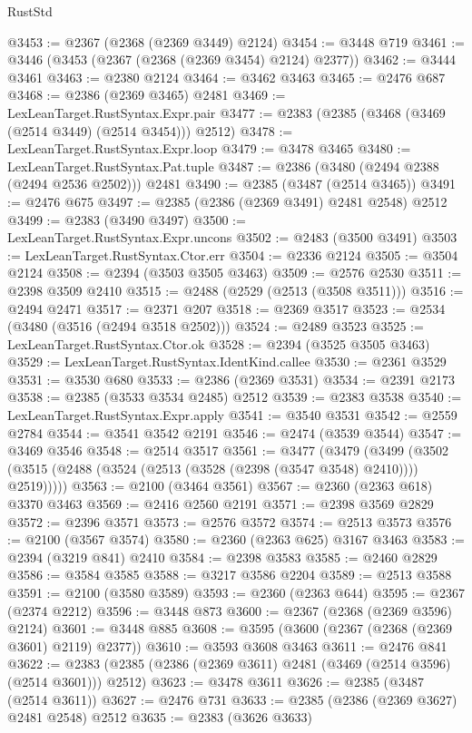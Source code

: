 \begin{lexlean}{RustStd}
\begin{coremodule}
@3453 := @2367 (@2368 (@2369 @3449) @2124)
@3454 := @3448 @719
@3461 := @3446 (@3453 (@2367 (@2368 (@2369 @3454) @2124) @2377))
@3462 := @3444 @3461
@3463 := @2380 @2124
@3464 := @3462 @3463
@3465 := @2476 @687
@3468 := @2386 (@2369 @3465) @2481
@3469 := LexLeanTarget.RustSyntax.Expr.pair
@3477 := @2383 (@2385 (@3468 (@3469 (@2514 @3449) (@2514 @3454))) @2512)
@3478 := LexLeanTarget.RustSyntax.Expr.loop
@3479 := @3478 @3465
@3480 := LexLeanTarget.RustSyntax.Pat.tuple
@3487 := @2386 (@3480 (@2494 @2388 (@2494 @2536 @2502))) @2481
@3490 := @2385 (@3487 (@2514 @3465))
@3491 := @2476 @675
@3497 := @2385 (@2386 (@2369 @3491) @2481 @2548) @2512
@3499 := @2383 (@3490 @3497)
@3500 := LexLeanTarget.RustSyntax.Expr.uncons
@3502 := @2483 (@3500 @3491)
@3503 := LexLeanTarget.RustSyntax.Ctor.err
@3504 := @2336 @2124
@3505 := @3504 @2124
@3508 := @2394 (@3503 @3505 @3463)
@3509 := @2576 @2530
@3511 := @2398 @3509 @2410
@3515 := @2488 (@2529 (@2513 (@3508 @3511)))
@3516 := @2494 @2471
@3517 := @2371 @207
@3518 := @2369 @3517
@3523 := @2534 (@3480 (@3516 (@2494 @3518 @2502)))
@3524 := @2489 @3523
@3525 := LexLeanTarget.RustSyntax.Ctor.ok
@3528 := @2394 (@3525 @3505 @3463)
@3529 := LexLeanTarget.RustSyntax.IdentKind.callee
@3530 := @2361 @3529
@3531 := @3530 @680
@3533 := @2386 (@2369 @3531)
@3534 := @2391 @2173
@3538 := @2385 (@3533 @3534 @2485) @2512
@3539 := @2383 @3538
@3540 := LexLeanTarget.RustSyntax.Expr.apply
@3541 := @3540 @3531
@3542 := @2559 @2784
@3544 := @3541 @3542 @2191
@3546 := @2474 (@3539 @3544)
@3547 := @3469 @3546
@3548 := @2514 @3517
@3561 := @3477
    (@3479
      (@3499 (@3502 (@3515 (@2488 (@3524 (@2513 (@3528 (@2398 (@3547 @3548) @2410)))) @2519)))))
@3563 := @2100 (@3464 @3561)
@3567 := @2360 (@2363 @618) @3370 @3463
@3569 := @2416 @2560 @2191
@3571 := @2398 @3569 @2829
@3572 := @2396 @3571
@3573 := @2576 @3572
@3574 := @2513 @3573
@3576 := @2100 (@3567 @3574)
@3580 := @2360 (@2363 @625) @3167 @3463
@3583 := @2394 (@3219 @841) @2410
@3584 := @2398 @3583
@3585 := @2460 @2829
@3586 := @3584 @3585
@3588 := @3217 @3586 @2204
@3589 := @2513 @3588
@3591 := @2100 (@3580 @3589)
@3593 := @2360 (@2363 @644)
@3595 := @2367 (@2374 @2212)
@3596 := @3448 @873
@3600 := @2367 (@2368 (@2369 @3596) @2124)
@3601 := @3448 @885
@3608 := @3595 (@3600 (@2367 (@2368 (@2369 @3601) @2119) @2377))
@3610 := @3593 @3608 @3463
@3611 := @2476 @841
@3622 := @2383 (@2385 (@2386 (@2369 @3611) @2481 (@3469 (@2514 @3596) (@2514 @3601))) @2512)
@3623 := @3478 @3611
@3626 := @2385 (@3487 (@2514 @3611))
@3627 := @2476 @731
@3633 := @2385 (@2386 (@2369 @3627) @2481 @2548) @2512
@3635 := @2383 (@3626 @3633)

\end{coremodule}
\end{lexlean}
